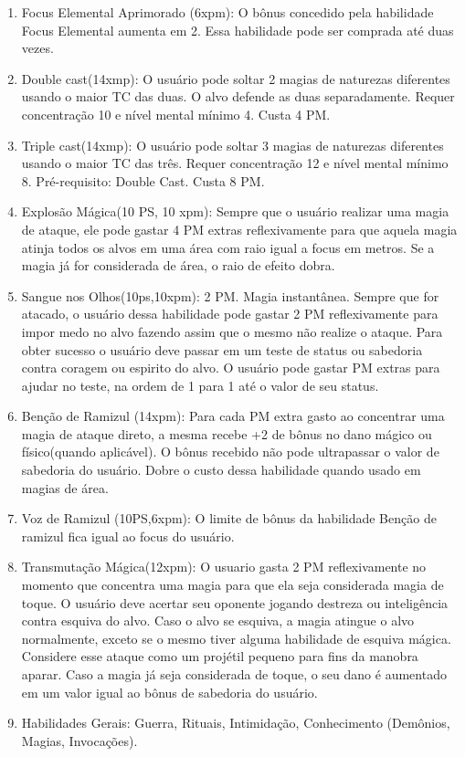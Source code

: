 \begin{enumerate}
 	\item Focus Elemental Aprimorado (6xpm): O bônus concedido pela habilidade Focus Elemental aumenta em 2. Essa habilidade pode ser comprada até duas vezes.
 	
 	\item Double cast(14xmp): O usuário pode soltar 2 magias de naturezas diferentes usando o maior TC das duas. O alvo defende as duas separadamente. Requer concentração 10 e nível mental mínimo 4. Custa 4 PM.
 	
 	\item Triple cast(14xmp): O usuário pode soltar 3 magias de naturezas diferentes usando o maior TC das três. Requer concentração 12 e nível mental mínimo 8. Pré-requisito: Double Cast. Custa 8 PM.

	\item	Explosão Mágica(10 PS, 10 xpm): Sempre que o usuário realizar uma magia de ataque, ele pode gastar 4 PM extras reflexivamente para que aquela magia atinja todos os alvos em uma área com raio igual a focus em metros. Se a magia já for considerada de área, o raio de efeito dobra.

	\item Sangue nos Olhos(10ps,10xpm): 2 PM. Magia instantânea.\newline
Sempre que for atacado, o usuário dessa habilidade pode gastar 2 PM reflexivamente para impor medo no alvo fazendo assim que o mesmo não realize o ataque. Para obter sucesso o usuário deve passar em um teste de status ou sabedoria contra coragem ou espirito do alvo. O usuário pode gastar PM extras para ajudar no teste, na ordem de 1 para 1 até o valor de seu status.

	\item Benção de Ramizul (14xpm): Para cada PM extra gasto ao concentrar uma magia de ataque direto, a mesma recebe +2 de bônus no dano mágico ou físico(quando aplicável). O bônus recebido não pode ultrapassar o valor de sabedoria do usuário. Dobre o custo dessa habilidade quando usado em magias de área.
  	
  	\item Voz de Ramizul (10PS,6xpm): O limite de bônus da habilidade Benção de ramizul fica igual ao focus do usuário.
  	
 	\item Transmutação Mágica(12xpm): O usuario gasta 2 PM reflexivamente no momento que concentra uma magia para que ela seja considerada magia de toque. O usuário deve acertar seu oponente jogando destreza ou inteligência contra esquiva do alvo. Caso o alvo se esquiva, a magia atingue o alvo normalmente, exceto se o mesmo tiver alguma habilidade de esquiva mágica. Considere esse ataque como um projétil pequeno para fins da manobra aparar. Caso a magia já seja considerada de toque, o seu dano é aumentado em um valor igual ao bônus de sabedoria do usuário.
  	
 	\item Habilidades Gerais: Guerra, Rituais, Intimidação, Conhecimento (Demônios, Magias, Invocações).
 
\end{enumerate}
 
